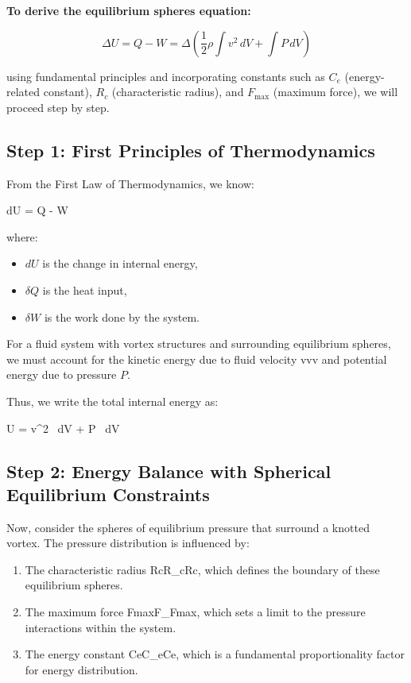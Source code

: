 

\textbf{To derive the equilibrium spheres equation:}

\[
\Delta U = Q - W = \Delta \left( \frac{1}{2} \rho \int v^2 \, dV + \int P \, dV \right)
\]

using fundamental principles and incorporating constants such as $C_e$ (energy-related constant), $R_c$ (characteristic radius), and $F_{\max}$ (maximum force), we will proceed step by step.





\subsection*{Step 1: First Principles of Thermodynamics}
From the First Law of Thermodynamics, we know:

dU = \delta Q - \delta W

where:

\begin{itemize}
\item $dU$ is the change in internal energy,
\item $\delta Q$ is the heat input,
\item $\delta W$ is the work done by the system.
\end{itemize}
For a fluid system with vortex structures and surrounding equilibrium spheres, we must account for the kinetic energy due to fluid velocity vvv and potential energy due to pressure $P$.

Thus, we write the total internal energy as:

U =  \rho \int v^2 \, dV + \int P \, dV



\subsection*{Step 2: Energy Balance with Spherical Equilibrium Constraints}
Now, consider the spheres of equilibrium pressure that surround a knotted vortex. The pressure distribution is influenced by:

\begin{enumerate}
\item The characteristic radius RcR_cRc, which defines the boundary of these equilibrium spheres.
\item The maximum force Fmax⁡F_{\max}Fmax, which sets a limit to the pressure interactions within the system.
\item The energy constant CeC_eCe, which is a fundamental proportionality factor for energy distribution.
\end{enumerate}

